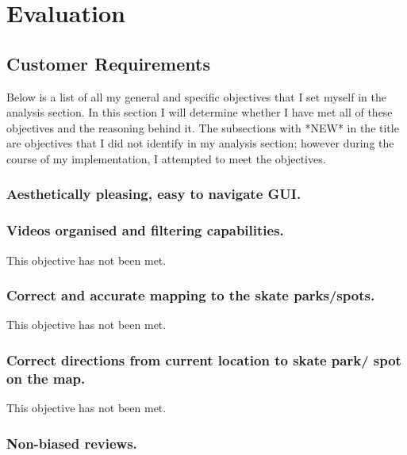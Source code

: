 \chapter{Evaluation}

\section{Customer Requirements}

Below is a list of all my general and specific objectives that I set myself in the analysis section. In this section I will determine whether I have met all of these objectives and the reasoning behind it. The subsections with *NEW* in the title are objectives that I did not identify in my analysis section; however during the course of my implementation, I attempted to meet the objectives. 

\subsection{Aesthetically pleasing, easy to navigate GUI.} %




\subsection{Videos organised and filtering capabilities.}

This objective has not been met.



\subsection{Correct and accurate mapping to the skate parks/spots.}

This objective has not been met.



\subsection {Correct directions from current location to skate park/ spot on the map.}

This objective has not been met.



\subsection{Non-biased reviews.}

